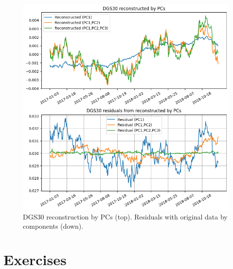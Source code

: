 \begin{figure}[hp]
	\centering
	\includegraphics[width=0.65\linewidth]{figures/dgs30_reco}
	\caption{DGS30 reconstruction by PCs (top). Residuals with original data by components (down).}
	\label{fig:pca_dsg30}
\end{figure}

\newpage
\section*{Exercises}


